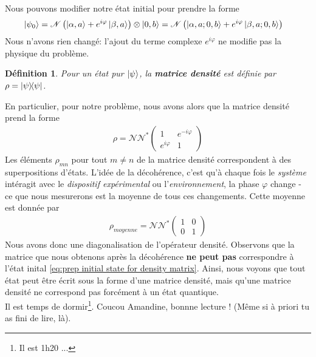 \documentclass[11pt,oneside,a4paper]{article}
\newtheorem{definition}[theorem]{Définition}
\begin{document}
Nous pouvons modifier notre état initial pour prendre la forme
\begin{align}
  \ket{\psi_0} &= \mathcal{N}\left(\ket{\alpha,a}+e^{i\varphi}\ket{\beta,a}\right)\otimes\ket{0,b} = \mathcal{N}\left(\ket{\alpha,a;0,b}+e^{i\varphi}\ket{\beta,a;0,b}\right)\label{eq:prep initial state for density matrix}
\end{align}
Nous n'avons rien changé: l'ajout du terme complexe $e^{i\varphi}$ ne modifie pas la physique du problème.
\begin{definition}
  Pour un état pur $\ket{\psi}$, la \textbf{matrice densité} est définie par $\rho=\ketbra{\psi}$.
\end{definition}
En particulier, pour notre problème, nous avons alors que la matrice densité prend la forme
\begin{align*}
  \rho = \mathcal{N}\mathcal{N}^*\begin{pmatrix}
    1 & e^{-i\varphi}\\
    e^{i\varphi} & 1
  \end{pmatrix}
\end{align*}
Les éléments $\rho_{mn}$ pour tout $m\neq n$ de la matrice densité correspondent à des superpositions d'états. L'idée de la décohérence, c'est qu'à chaque fois le \emph{système} intéragit avec le \emph{dispositif expérimental} ou l'\emph{environnement}, la phase $\varphi$ change - ce que nous mesurerons est la moyenne de tous ces changements. Cette moyenne est donnée par
\begin{align*}
  \rho_{moyenne} = \mathcal{N}\mathcal{N}^*\begin{pmatrix}
    1 & 0\\
    0 & 1
  \end{pmatrix}
\end{align*}
Nous avons donc une diagonalisation de l'opérateur densité. Observons que la matrice que nous obtenons après la décohérence \textbf{ne peut pas} correspondre à l'état inital \eqref{eq:prep initial state for density matrix}. Ainsi, nous voyons que tout état peut être écrit sous la forme d'une matrice densité, mais qu'une matrice densité ne correspond pas forcément à un état quantique.\\

\color{red} Il est temps de dormir\footnote{Il est 1h20 ...}. Coucou Amandine, bonnne lecture ! (Même si à priori tu as fini de lire, là).
\end{document}
